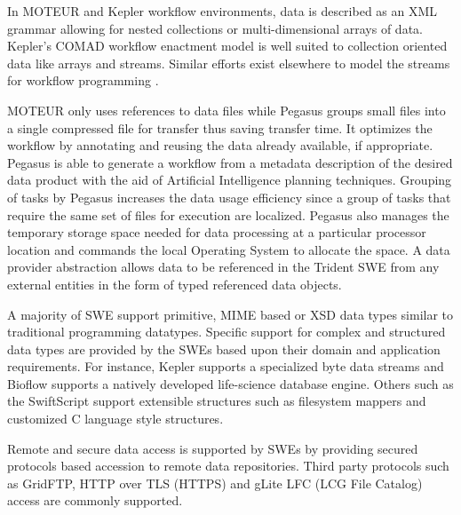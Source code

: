 In MOTEUR and Kepler workflow environments, data is described as an XML grammar
allowing for nested collections or multi-dimensional arrays of data. Kepler's
COMAD \cite{keplercomad} workflow enactment model is well suited to collection
oriented data like arrays and streams. Similar efforts exist elsewhere to model
the streams for workflow programming
\cite{blower-haines-etal:2005,herath-plale:2010}.

MOTEUR only uses references to data files while Pegasus groups small files into
a single compressed file for transfer thus saving transfer time. It optimizes
the workflow by annotating and reusing the data already available, if
appropriate. Pegasus is able to generate a workflow from a metadata description
of the desired data product with the aid of Artificial Intelligence planning
techniques. Grouping of tasks by Pegasus increases the data usage efficiency
since a group of tasks that require the same set of files for execution are
localized. Pegasus also manages the temporary storage space needed for data
processing at a particular processor location and commands the local Operating
System to allocate the space. A data provider abstraction allows data to be
referenced in the Trident SWE from any external entities in the form of typed
referenced data objects.

A majority of SWE support primitive, MIME based or XSD data types similar to
traditional programming datatypes. Specific support for complex and structured
data types are provided by the SWEs based upon their domain and application
requirements. For instance, Kepler supports a specialized byte data streams and
Bioflow supports a natively developed life-science database engine. Others such
as the SwiftScript support extensible structures such as filesystem mappers and
customized C language style structures.

Remote and secure data access is supported by SWEs by providing secured
protocols based accession to remote data repositories. Third party protocols
such as GridFTP, HTTP over TLS (HTTPS) and gLite LFC (LCG File Catalog) access
are commonly supported.

